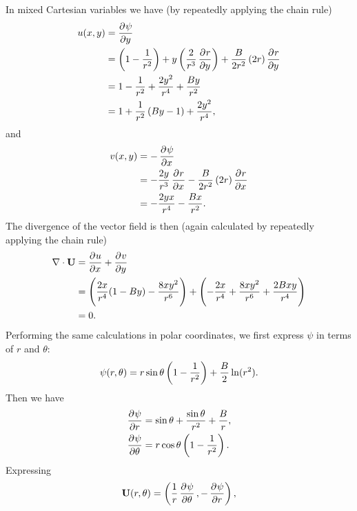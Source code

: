 \documentclass{article}
\def\*#1{\mathbf{#1}}
\begin{document}
In mixed Cartesian variables we have (by repeatedly applying the chain
rule)
%
\begin{align*}
    u(x, y)
        &= \dpd{\psi}{y} \\
        &=
            \del{1 - \frac{1}{r^2}}
            + y \del{\frac{2}{r^3} \dpd{r}{y}}
            + \frac{B}{2 r^2} \del{2 r} \dpd{r}{y} \\
        &=
            1 - \frac{1}{r^2}
            + \frac{2 y^2}{r^4}
            + \frac{B y}{r^2} \\
        &=
            1
            + \frac{1}{r^2} \del{B y - 1}
            + \frac{2 y^2}{r^4}
        ,
\end{align*}
%
and
%
\begin{align*}
    v(x, y)
        &= - \dpd{\psi}{x} \\
        &=
            - \frac{2 y}{r^3} \dpd{r}{x}
            - \frac{B}{2 r^2} \del{2 r} \dpd{r}{x} \\
        &=
            - \frac{2 y x}{r^4}
            - \frac{B x}{r^2}
        .
\end{align*}
%
The divergence of the vector field is then (again calculated by
repeatedly applying the chain rule)
%
\begin{align*}
     \nabla \cdot \*U
        &= \dpd{u}{x} + \dpd{v}{y} \\
        &=
            \del{\frac{2 x}{r^4} (1 - B y) - \frac{8 x y^2}{r^6}}
            +
            \del{
                - \frac{2 x}{r^4}
                + \frac{8 x y^2}{r^6}
                + \frac{2 B x y}{r^4}
            } \\
        &= 0
        .
\end{align*}
%
Performing the same calculations in polar coordinates, we
first express $\psi$ in terms of $r$ and $\theta$:
%
\begin{equation*}
    \psi(r, \theta) = r \sin \theta \del{1 - \frac{1}{r^2}} + \frac{B}{2} \ln(r^2)
    .
\end{equation*}
%
Then we have
%
\begin{align*}
    \dpd{\psi}{r} &=
        \sin \theta
        + \frac{\sin \theta}{r^2}
        + \frac{B}{r}
        , \\
    \dpd{\psi}{\theta} &=
        r \cos \theta \del{1 - \frac{1}{r^2}}
        .
\end{align*}
%
Expressing
%
\begin{equation*}
    \*U(r, \theta) = \del{\frac{1}{r} \dpd{\psi}{\theta}, - \dpd{\psi}{r}}
    ,
\end{equation*}
\end{document}
